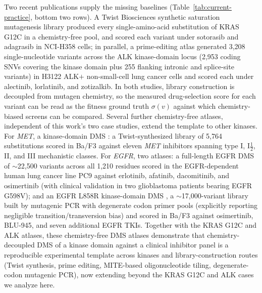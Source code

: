 \documentclass[11pt,a4paper]{article}
\begin{document}
Two recent publications supply the missing baselines
(Table~\ref{tab:current-practice}, bottom two rows). A Twist Biosciences
synthetic saturation mutagenesis library \citep{feng2022} produced every
single-amino-acid substitution of KRAS G12C in a chemistry-free pool,
and scored each variant under sotorasib and adagrasib in NCI-H358 cells;
in parallel, a prime-editing atlas \citep{oh2026} generated 3,208
single-nucleotide variants across the ALK kinase-domain locus (2,953
coding SNVs covering the kinase domain plus 255 flanking intronic and
splice-site variants) in H3122
ALK$+$ non-small-cell lung cancer cells and scored each under alectinib,
lorlatinib, and zotizalkib. In both studies, library construction is
decoupled from mutagen chemistry, so the measured drug-selection score
for each variant can be read as the fitness ground truth $\sigma(v)$
against which chemistry-biased screens can be compared. Several further
chemistry-free atlases, independent of this work's two case studies,
extend the template to other kinases. For \textit{MET}, a kinase-domain
DMS \citep{estevam2024}: a Twist-synthesized library of 5,764
substitutions scored in Ba/F3 against eleven \textit{MET} inhibitors
spanning type I, I$\tfrac{1}{2}$, II, and III mechanistic classes. For
\textit{EGFR}, two atlases: a full-length EGFR DMS \citep{hayes2024} of
$\sim$22{,}500 variants across all 1{,}210 residues scored in the
EGFR-dependent human lung cancer line PC9 against erlotinib, afatinib,
dacomitinib, and osimertinib (with clinical validation in two
glioblastoma patients bearing EGFR G598V); and an EGFR L858R
kinase-domain DMS \citep{wang2025}, a $\sim$17{,}000-variant library
built by mutagenic PCR with degenerate codon primer pools (explicitly
reporting negligible transition/transversion bias) and scored in Ba/F3
against osimertinib, BLU-945, and seven additional EGFR TKIs. Together
with the KRAS G12C and ALK atlases, these chemistry-free DMS atlases
demonstrate that chemistry-decoupled DMS of a kinase domain against a
clinical inhibitor panel is a reproducible experimental template across
kinases and library-construction routes (Twist synthesis, prime editing,
MITE-based oligonucleotide tiling, degenerate-codon mutagenic PCR), now
extending beyond the KRAS G12C and ALK cases we analyze here.
\end{document}
